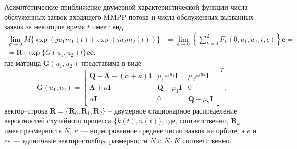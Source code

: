 \begin{theorem} \label{mmpp_theorem}
	Асимптотические приближение двумерной характеристической функции числа обслуженных заявок входящего MMPP-потока и числа обслуженных вызванных заявок за некоторое время $t$ имеет вид
	\begin{equation*} \label{theorem_twodim_map}
		\begin{split}
		  \lim_{\sigma \xrightarrow{} 0} M\{\exp(ju_{1}m_{1}(t))\exp(ju_{2}m_{2}(t))\} &=
			 \lim_{\epsilon \xrightarrow{} 0} \left\{ \sum_{k=0}^{2}F_{k}(0,u_{1},u_{2},t,\epsilon) \right\}\boldsymbol{e} =\\ = \boldsymbol{R} \cdot \exp\{G(u_{1},u_{2})t\}\boldsymbol{ee},
		\end{split}
	\end{equation*}
	где матрица $\boldsymbol{G}(u_{1},u_{2})$ представима в виде
	\begin{equation*}
		\boldsymbol{G}(u_{1},u_{2})=\begin{bmatrix}
			\boldsymbol{Q}-\boldsymbol{\Lambda}-(\alpha + \kappa)\boldsymbol{I} & \mu_{1}e^{ju_{1}}\boldsymbol{I} &  \mu_{2}e^{ju_{2}}\boldsymbol{I}\\
			\boldsymbol{\Lambda}+\kappa\boldsymbol{I} & \boldsymbol{Q}-\mu_{1}\boldsymbol{I} & 0\\
			\alpha\boldsymbol{I} & 	0 &	\boldsymbol{Q}-\mu_{2}\boldsymbol{I}
		\end{bmatrix}^{T},
	\end{equation*}
	вектор--строка $\boldsymbol{R}=\{\boldsymbol{R}_{0},\boldsymbol{R}_{1},\boldsymbol{R}_{2}\}$ -- двумерное стационарное распределение вероятностей случайного процесса $\{k(t),n(t)\}$, где, соответственно,  $\boldsymbol{R}_{k}$ имеет размерность $N$, $\kappa$ --- нормированное среднее число заявок на орбите, а $e$ и $ee$ --- единичные вектор--столбцы размерности $N$ и $N \cdot K$ соответственно.
\end{theorem}

